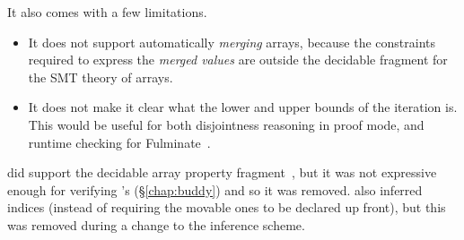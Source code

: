 It also comes with a few limitations.
\begin{itemize}
    \item It does not support automatically \emph{merging} arrays, because the
        constraints required to express the \emph{merged values} are outside
        the decidable fragment for the SMT theory of arrays.
    \item It does not make it clear what the lower and upper bounds of the
        iteration is. This would be useful for both disjointness reasoning in
        proof mode, and runtime checking for
        Fulminate~.
\end{itemize}

 did support the decidable array property
fragment~, but it was not expressive enough for
verifying 's  (\S\ref{chap:buddy}) and so it was
removed.  also inferred indices (instead of
requiring the movable ones to be declared up front), but this was removed
during a change to the inference
scheme.\label{sn:new-inf}

